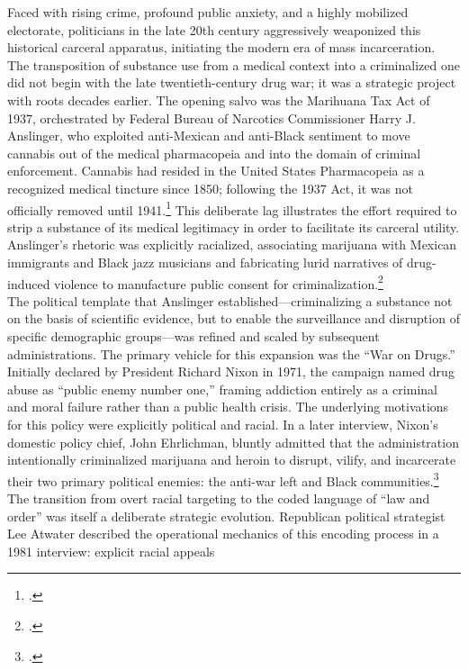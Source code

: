 \documentclass[
]{article}
\begin{document}
Faced with rising crime, profound public anxiety, and a highly mobilized
electorate, politicians in the late 20th century aggressively weaponized
this historical carceral apparatus, initiating the modern era of mass
incarceration.\\
The transposition of substance use from a medical context into a
criminalized one did not begin with the late twentieth-century drug war;
it was a strategic project with roots decades earlier. The opening salvo
was the Marihuana Tax Act of 1937, orchestrated by Federal Bureau of
Narcotics Commissioner Harry J. Anslinger, who exploited anti-Mexican
and anti-Black sentiment to move cannabis out of the medical
pharmacopeia and into the domain of criminal enforcement. Cannabis had
resided in the United States Pharmacopeia as a recognized medical
tincture since 1850; following the 1937 Act, it was not officially
removed until 1941.\footcite{anslinger_marihuana_1937} This deliberate
lag illustrates the effort required to strip a substance of its medical
legitimacy in order to facilitate its carceral utility. Anslinger's
rhetoric was explicitly racialized, associating marijuana with Mexican
immigrants and Black jazz musicians and fabricating lurid narratives of
drug-induced violence to manufacture public consent for
criminalization.\footcite{anslinger_rhetoric}\\
The political template that Anslinger established---criminalizing a
substance not on the basis of scientific evidence, but to enable the
surveillance and disruption of specific demographic groups---was refined
and scaled by subsequent administrations. The primary vehicle for this
expansion was the ``War on Drugs.'' Initially declared by President
Richard Nixon in 1971, the campaign named drug abuse as ``public enemy
number one,'' framing addiction entirely as a criminal and moral failure
rather than a public health crisis. The underlying motivations for this
policy were explicitly political and racial. In a later interview,
Nixon's domestic policy chief, John Ehrlichman, bluntly admitted that
the administration intentionally criminalized marijuana and heroin to
disrupt, vilify, and incarcerate their two primary political enemies:
the anti-war left and Black communities.\footcite{ehrlichman_admission}\\
The transition from overt racial targeting to the coded language of
``law and order'' was itself a deliberate strategic evolution. Republican
political strategist Lee Atwater described the operational mechanics of
this encoding process in a 1981 interview: explicit racial appeals
\end{document}
